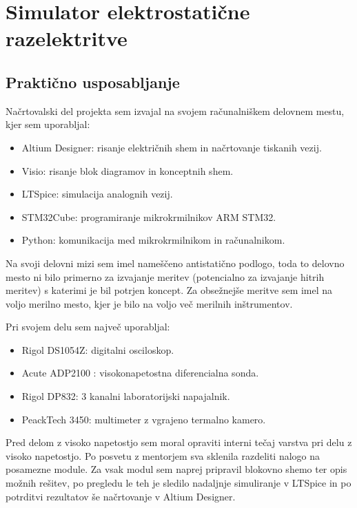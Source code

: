 \documentclass[a4paper,twoside,openright,12pt,Slovene]{book}
\begin{document}
\chapter{Simulator elektrostatične razelektritve} \label{ESDSIM}

	\section{Praktično usposabljanje}
	Načrtovalski del projekta sem izvajal na svojem računalniškem delovnem mestu, kjer sem uporabljal:
	\begin{itemize}
		\item Altium Designer: risanje električnih shem in načrtovanje tiskanih vezij.
		\item Visio: risanje blok diagramov in konceptnih shem.
		\item LTSpice: simulacija analognih vezij.
		\item STM32Cube: programiranje mikrokrmilnikov ARM STM32.
		\item Python: komunikacija med mikrokrmilnikom in računalnikom.
	\end{itemize}
	Na svoji delovni mizi sem imel nameščeno antistatično podlogo, toda to delovno mesto ni bilo primerno za izvajanje meritev (potencialno za izvajanje hitrih meritev) s katerimi je bil potrjen koncept.
	Za obsežnejše meritve sem imel na voljo merilno mesto, kjer je bilo na voljo več merilnih inštrumentov. 
	
	Pri svojem delu sem največ uporabljal:
	\begin{itemize}
		\item Rigol DS1054Z: digitalni osciloskop.
		\item Acute ADP2100 : visokonapetostna diferencialna sonda.
		\item Rigol DP832: 3 kanalni laboratorijski napajalnik.
		\item PeackTech 3450: multimeter z vgrajeno termalno kamero.
	\end{itemize}
	Pred delom z visoko napetostjo sem moral opraviti interni tečaj varstva pri delu z visoko napetostjo. Po posvetu z mentorjem sva sklenila razdeliti nalogo na posamezne module. Za vsak modul sem naprej pripravil blokovno shemo ter opis možnih rešitev, po pregledu le teh je sledilo nadaljnje simuliranje v LTSpice in po potrditvi rezultatov še načrtovanje v Altium Designer.
	
\end{document}
